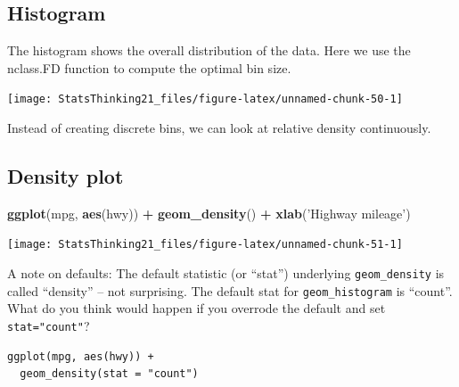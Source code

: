 \documentclass[12pt,]{book}
\newenvironment{Shaded}{\begin{snugshade}}{\end{snugshade}}
\newcommand{\DataTypeTok}[1]{\textcolor[rgb]{0.13,0.29,0.53}{#1}}
\newcommand{\KeywordTok}[1]{\textcolor[rgb]{0.13,0.29,0.53}{\textbf{#1}}}
\newcommand{\NormalTok}[1]{#1}
\newcommand{\OperatorTok}[1]{\textcolor[rgb]{0.81,0.36,0.00}{\textbf{#1}}}
\newcommand{\StringTok}[1]{\textcolor[rgb]{0.31,0.60,0.02}{#1}}
\begin{document}
\hypertarget{histogram}{%
\subsection{Histogram}\label{histogram}}

The histogram shows the overall distribution of the data. Here we use the nclass.FD function to compute the optimal bin size.

\begin{Shaded}
\end{Shaded}

\texttt{[image: StatsThinking21\_files/figure-latex/unnamed-chunk-50-1]}

Instead of creating discrete bins, we can look at relative density continuously.

\hypertarget{density-plot}{%
\subsection{Density plot}\label{density-plot}}

\begin{Shaded}
\begin{Highlighting}[]
\KeywordTok{ggplot}\NormalTok{(mpg, }\KeywordTok{aes}\NormalTok{(hwy)) }\OperatorTok{+}
\StringTok{  }\KeywordTok{geom_density}\NormalTok{() }\OperatorTok{+}
\StringTok{  }\KeywordTok{xlab}\NormalTok{(}\StringTok{'Highway mileage'}\NormalTok{) }
\end{Highlighting}
\end{Shaded}

\texttt{[image: StatsThinking21\_files/figure-latex/unnamed-chunk-51-1]}

A note on defaults: The default statistic (or ``stat'') underlying \texttt{geom\_density} is called ``density'' -- not surprising. The default stat for \texttt{geom\_histogram} is ``count''. What do you think would happen if you overrode the default and set \texttt{stat="count"}?

\begin{verbatim}
ggplot(mpg, aes(hwy)) +
  geom_density(stat = "count")
\end{verbatim}
\end{document}
